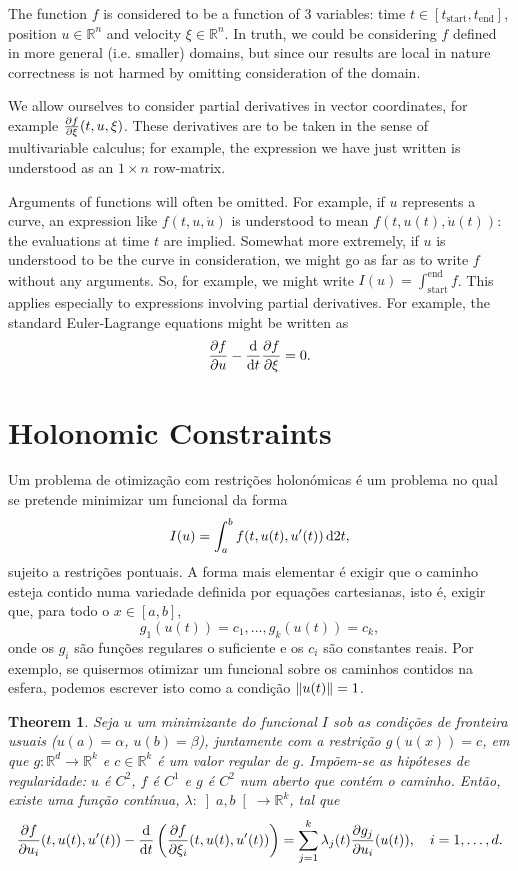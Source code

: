 \documentclass{article}
\newtheorem{theorem}{Theorem}
\theoremstyle{nonumberplain}
\theoremstyle{nonumberplain}
\newcommand{\R}{\mathbb{R}}
\newcommand{\tstart}{\mathrm{start}}
\newcommand{\tend}{\mathrm{end}}
\DeclarePairedDelimiter\norm{\lVert}{\rVert}
\begin{document}
The function $f$ is considered to be a function of 3 variables: time $t \in [t_\tstart, t_\tend]$, position $u \in \R^n$ and velocity $\xi \in \R^n$. In truth, we could be considering $f$ defined in more general (i.e. smaller) domains, but since our results are local in nature correctness is not harmed by omitting consideration of the domain.

We allow ourselves to consider partial derivatives in vector coordinates, for example $\diffp f \xi (t, u, \xi)$. These derivatives are to be taken in the sense of multivariable calculus; for example, the expression we have just written is understood as an $1 \times n$ row-matrix.

Arguments of functions will often be omitted. For example, if $u$ represents a curve, an expression like $f(t,u,\dot u)$ is understood to mean $f(t,u(t),\dot u(t))$: the evaluations at time $t$ are implied. Somewhat more extremely, if $u$ is understood to be the curve in consideration, we might go as far as to write $f$ without any arguments. So, for example, we might write $I(u) = \int_\tstart^\tend f$. This applies especially to expressions involving partial derivatives. For example, the standard Euler-Lagrange equations might be written as
\[\diffp f u - \diff*{\diffp f \xi}t = 0.\]


\section{Holonomic Constraints}

Um problema de otimização com restrições holonómicas é um problema no qual se pretende minimizar um funcional da forma
\[I(u) = \int_a^b f(t,u(t),u'(t)) \dl2 t,\]
sujeito a restrições pontuais. A forma mais elementar é exigir que o caminho esteja contido numa variedade definida por equações cartesianas, isto é, exigir que, para todo o $x \in [a,b]$,
\[g_1(u(t)) = c_1, \dots, g_k(u(t)) = c_k,\]
onde os $g_i$ são funções regulares o suficiente e os $c_i$ são constantes reais. Por exemplo, se quisermos otimizar um funcional sobre os caminhos contidos na esfera, podemos escrever isto como a condição $\norm{u(t)} = 1$.

\begin{theorem}
Seja $u$ um minimizante do funcional $I$ sob as condições de fronteira usuais ($u(a) = \alpha$, $u(b) = \beta$), juntamente com a restrição $g(u(x)) = c$, em que $g \colon \R^d \to \R^k$ e $c \in \R^k$ é um valor regular de $g$. Impõem-se as hipóteses de regularidade: $u$ é $C^2$, $f$ é $C^1$ e $g$ é $C^2$ num aberto que contém o caminho. Então, existe uma função contínua, $\lambda \colon \left]a,b\right[ \to \R^k$, tal que
\[\diffp f {u_i}(t,u(t),u'(t)) - \diff*{\left(\diffp f {\xi_i}(t,u(t),u'(t))\right)}t = \sum_{j=1}^k \lambda_j(t) \diffp {g_j} {u_i} (u(t)), \quad i = 1, \dots, d.\]
\end{theorem}
\end{document}
